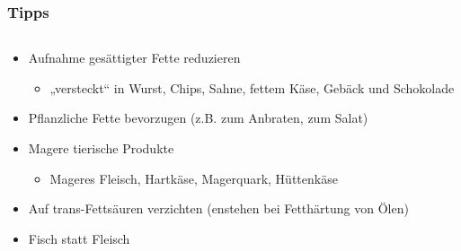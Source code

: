 \documentclass[ngerman, aspectratio=169]{beamer}
\begin{document}
\begin{frame}
  \frametitle{Tipps}
  \begin{columns}
    \begin{column}{0.7\textwidth}
      \begin{itemize}
      \item<+-> Aufnahme gesättigter Fette reduzieren
        \begin{itemize}
        \item „versteckt“ in Wurst, Chips, Sahne, fettem Käse, Gebäck und Schokolade
        \end{itemize}
      \item<+-> Pflanzliche Fette bevorzugen (z.B. zum Anbraten, zum Salat)
      \item<+-> Magere tierische Produkte
        \begin{itemize}
        \item Mageres Fleisch, Hartkäse, Magerquark, Hüttenkäse
        \end{itemize}
      \item<+-> Auf trans-Fettsäuren verzichten (enstehen bei Fetthärtung von Ölen)
      \item<+-> Fisch statt Fleisch

      \end{itemize}
    \end{column}
    

\end{columns}
\end{frame}
\end{document}
